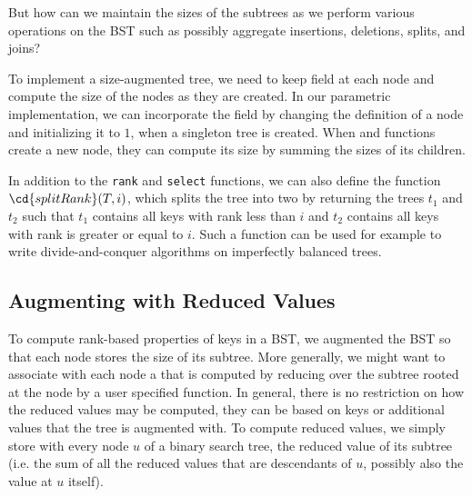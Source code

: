 \begin{question}
  But how can we maintain the sizes of the subtrees as we perform
  various operations on the BST such as possibly aggregate insertions,
  deletions, splits, and joins?
\end{question}
%
To implement a size-augmented tree, we need to keep  field at
each node and compute the size of the nodes as they are created.
%
In our parametric implementation, we can incorporate the 
field by changing the definition of a node and initializing it to $1$,
when a singleton tree is created. 
%
When  and  functions create a new node, they
can compute its size by summing the sizes of its children.
%

In addition to the \texttt{rank} and \texttt{select} functions, we can
also define the function $\cd{splitRank}(T,i)$, which splits the
tree into two by returning the trees $t_1$ and $t_2$ such that $t_1$
contains all keys with rank less than $i$ and $t_2$ contains all keys
with rank is greater or equal to $i$. 
%
Such a function can be used for example to write divide-and-conquer
algorithms on imperfectly balanced trees.





\subsection{Augmenting with Reduced Values}

To compute rank-based properties of keys in a BST, we augmented the
BST so that each node stores the size of its subtree.  More generally,
we might want to associate with each node a  that
is computed by reducing over the subtree rooted at the node by a user
specified function.  In general, there is no restriction on how the
reduced values may be computed, they can be based on keys or
additional values that the tree is augmented with.
%
To compute reduced values, we simply store with every node $u$ of a
binary search tree, the reduced value of its subtree (i.e. the sum of
all the reduced values that are descendants of $u$, possibly also the
value at $u$ itself).

